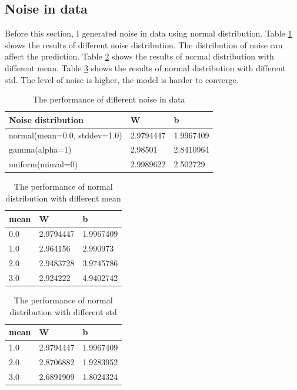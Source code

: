\documentclass{article}
\begin{document}
\subsection{Noise in data}
Before this section, I generated noise in data using normal distribution. Table \ref{noise} shows the results of different noise distribution. The distribution of noise can affect the prediction. Table \ref{normal1} shows the results of normal distribution with different mean. Table \ref{normal2} shows the results of normal distribution with different std. The level of noise is higher, the model is harder to converge.

\begin{table}
  \caption{The performance of different noise in data}
  \label{noise}
  \centering
  \begin{tabular}{lll}
    \toprule
    Noise distribution     & W     & b  \\
    \midrule
    normal(mean=0.0, stddev=1.0)     & 2.9794447 & 1.9967409    \\
    gamma(alpha=1)    & 2.98501      & 2.8410964  \\
    uniform(minval=0)    &2.9989622  &2.502729\\
    \bottomrule
  \end{tabular}
\end{table}

\begin{table}
  \caption{The performance of normal distribution with different mean}
  \label{normal1}
  \centering
  \begin{tabular}{lll}
    \toprule
    mean    & W     & b  \\
    \midrule
    0.0     & 2.9794447 & 1.9967409    \\
    1.0    & 2.964156 & 2.990973  \\
    2.0    &2.9483728 &3.9745786\\
    3.0    &2.924222 &4.9402742\\
    \bottomrule
  \end{tabular}
\end{table}

\begin{table}
  \caption{The performance of normal distribution with different std}
  \label{normal2}
  \centering
  \begin{tabular}{lll}
    \toprule
    mean    & W     & b  \\
    \midrule
    1.0    & 2.9794447 & 1.9967409 \\
    2.0    &2.8706882 &1.9283952\\
    3.0    &2.6891909 &1.8024324\\
    \bottomrule
  \end{tabular}
\end{table}
\end{document}
